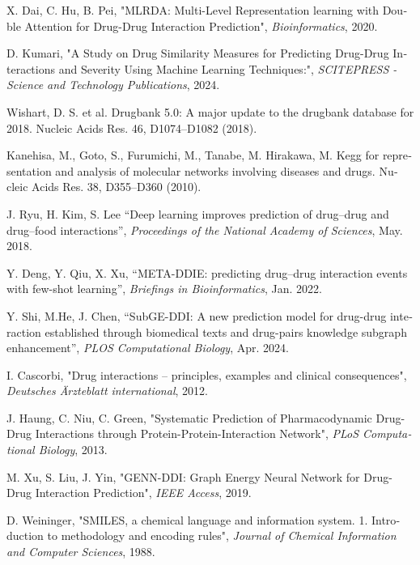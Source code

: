 \begin{thebibliography}{99}
\begin{latin}
X. Dai, C. Hu, B. Pei, "MLRDA: Multi-Level Representation learning with Double Attention for Drug-Drug Interaction Prediction", \textit{Bioinformatics}, 2020.

D. Kumari, "A Study on Drug Similarity Measures for Predicting Drug-Drug Interactions and Severity Using Machine Learning Techniques:", \textit{SCITEPRESS - Science and Technology Publications}, 2024.

Wishart, D. S. et al. Drugbank 5.0: A major update to the drugbank database for 2018. Nucleic Acids Res. 46, D1074–D1082 (2018).

Kanehisa, M., Goto, S., Furumichi, M., Tanabe, M. Hirakawa, M. Kegg for representation and analysis of molecular networks involving diseases and drugs. Nucleic Acids Res. 38, D355–D360 (2010).

J. Ryu, H. Kim, S. Lee “Deep learning improves prediction of drug–drug and drug–food interactions”, \textit{Proceedings of the National Academy of Sciences}, May. 2018.

Y. Deng, Y. Qiu, X. Xu, “META-DDIE: predicting drug–drug interaction events with few-shot learning”, \textit{Briefings in Bioinformatics}, Jan. 2022.

Y. Shi, M.He, J. Chen, “SubGE-DDI: A new prediction model for drug-drug interaction established through biomedical texts and drug-pairs knowledge subgraph enhancement”, \textit{PLOS Computational Biology}, Apr. 2024.

I. Cascorbi, "Drug interactions – principles, examples and clinical consequences", \textit{Deutsches Ärzteblatt international}, 2012.

J. Haung, C. Niu, C. Green, "Systematic Prediction of Pharmacodynamic Drug-Drug Interactions through Protein-Protein-Interaction Network", \textit{PLoS Computational Biology}, 2013.

M. Xu, S. Liu, J. Yin, "GENN-DDI: Graph Energy Neural Network for Drug-Drug Interaction Prediction", \textit{IEEE Access}, 2019.

D. Weininger, "SMILES, a chemical language and information system. 1. Introduction to methodology and encoding rules", \textit{Journal of Chemical Information and Computer Sciences}, 1988.


\end{latin}
\end{thebibliography}
